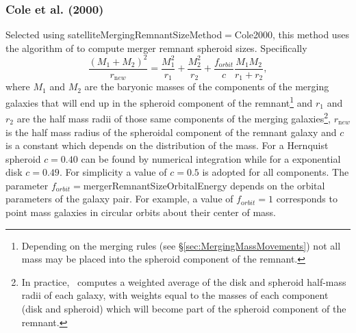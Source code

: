 \subsubsection{Cole et al. (2000)}\label{sec:MergerRemnantSizeCole2000}

Selected using {\normalfont \ttfamily satelliteMergingRemnantSizeMethod}$=${\normalfont \ttfamily Cole2000}, this method uses the algorithm of \cite{cole_hierarchical_2000} to compute merger remnant spheroid sizes. Specifically
\begin{equation}
\frac{(M_1+M_2)^2}{ r_{\mathrm new}} =
\frac{M_1^2}{r_1} + \frac{M_2^2}{r_2} + \frac{ f_{\mathrm orbit}}{c}
\frac{M_1 M_2}{r_1+r_2},
\end{equation}
where $M_1$ and $M_2$ are the baryonic masses of the components of the merging galaxies that will end up in the spheroid \gls{component} of the remnant\footnote{Depending on the merging rules (see \S\protect\ref{sec:MergingMassMovements}) not all mass may be placed into the spheroid \gls{component} of the remnant.} and $r_1$ and $r_2$ are the half mass radii of those same components of the merging galaxies\footnote{In practice, \glc\ computes a weighted average of the disk and spheroid half-mass radii of each galaxy, with weights equal to the masses of each \gls{component} (disk and spheroid) which will become part of the spheroid \gls{component} of the remnant.}, $r_{\mathrm new}$ is the half mass radius of the spheroidal \gls{component} of the remnant galaxy and $c$ is a constant which depends on the distribution of the mass. For a Hernquist spheroid $c=0.40$ can be found by numerical integration while for a exponential disk $c=0.49$. For simplicity a value of $c=0.5$ is adopted for all components. The 
parameter $f_{\mathrm orbit}=${\normalfont \ttfamily mergerRemnantSizeOrbitalEnergy} depends on the orbital parameters of the galaxy pair. For example, a value of $f_{\mathrm orbit} = 1$ corresponds to point mass galaxies in circular orbits about their center of mass. 

